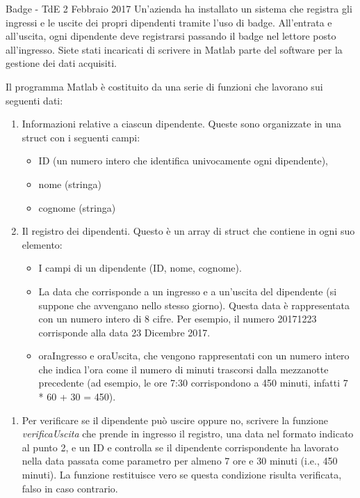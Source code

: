 \documentclass[format=169, 10pt]{beamer}
\begin{document}
\begin{frame}[allowframebreaks]{Badge - TdE 2 Febbraio 2017}
Un'azienda ha installato un sistema che registra gli ingressi e le uscite dei propri dipendenti tramite
l'uso di badge.
All'entrata e all'uscita, ogni dipendente deve registrarsi passando il badge nel lettore
posto all'ingresso.
Siete stati incaricati di scrivere in Matlab parte del software per la gestione dei
dati acquisiti.

\framebreak

Il programma Matlab è costituito da una serie di funzioni che lavorano sui seguenti dati:
\begin{enumerate}
\item Informazioni relative a ciascun dipendente. Queste sono organizzate in una struct con i
seguenti campi:
\begin{itemize}
\item ID (un numero intero che identifica univocamente ogni dipendente),
\item nome (stringa)
\item  cognome (stringa)
\end{itemize}
\item Il registro dei dipendenti. Questo è un array di struct che contiene in ogni suo elemento:
\begin{itemize}
\item I campi di un dipendente (ID, nome, cognome).
\item La data che corrisponde a un ingresso e a un’uscita del dipendente (si suppone che
avvengano nello stesso giorno).
 Questa data è rappresentata con un numero intero di 8 cifre. Per esempio, il numero 20171223 corrisponde alla data 23 Dicembre 2017.
\item oraIngresso e oraUscita, che vengono rappresentati con un numero intero che indica
l’ora come il numero di minuti trascorsi dalla mezzanotte precedente (ad esempio, le
ore 7:30 corrispondono a 450 minuti, infatti 7 * 60 + 30 = 450).
\end{itemize}
\end{enumerate}

\framebreak

\begin{enumerate}
	\item Per verificare se il dipendente può uscire oppure no, scrivere la funzione \emph{verificaUscita} che prende in ingresso il registro, una data nel formato indicato al punto 2, e un ID e controlla se il
dipendente corrispondente ha lavorato nella data passata come parametro per almeno 7 ore e 30
minuti (i.e., 450 minuti). La funzione restituisce vero se questa condizione risulta verificata, falso in
caso contrario.


\end{enumerate}
\end{frame}
\end{document}

